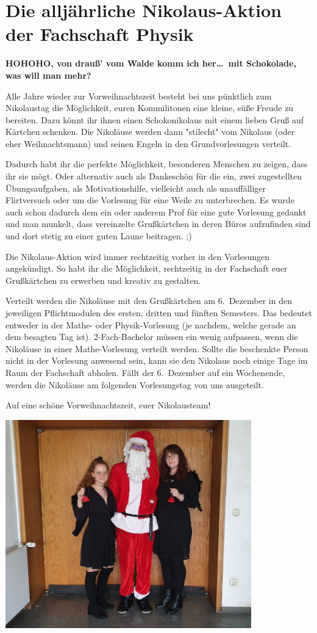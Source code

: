 \section{Die alljährliche Nikolaus-Aktion der Fachschaft Physik}
\begin{multicols}{2}
\textbf{HOHOHO, von drauß' vom Walde komm ich her\dots\
	mit Schokolade, was will man mehr?}

Alle Jahre wieder zur Vorweihnachtszeit besteht bei uns pünktlich zum Nikolaustag die Möglichkeit, euren Kommilitonen eine kleine, süße Freude zu bereiten. Dazu könnt ihr ihnen einen Schokonikolaus mit einem lieben Gruß auf Kärtchen schenken. 
Die Nikoläuse werden dann "stilecht" vom Nikolaus (oder eher Weihnachtsmann) und seinen Engeln in den Grundvorlesungen verteilt.

Dadurch habt ihr die perfekte Möglichkeit, besonderen Menschen zu zeigen, dass ihr sie mögt. Oder alternativ auch als Dankeschön für die ein, zwei zugestellten Übungsaufgaben, als Motivationshilfe, vielleicht auch als unauffälliger Flirtversuch oder um die Vorlesung für eine Weile zu unterbrechen. Es wurde auch schon dadurch dem ein oder anderem Prof für eine gute Vorlesung gedankt und man munkelt, dass vereinzelte Grußkärtchen in deren Büros aufzufinden sind und dort stetig zu einer guten Laune beitragen. ;)

Die Nikolaus-Aktion wird immer rechtzeitig vorher in den Vorlesungen angekündigt. So habt ihr die Möglichkeit, rechtzeitig in der Fachschaft euer Grußkärtchen zu erwerben und kreativ zu gestalten. 

Verteilt werden die Nikoläuse mit den Grußkärtchen am 6.~Dezember in den jeweiligen Pflichtmodulen des ersten, dritten und fünften Semesters. Das bedeutet entweder in der Mathe- oder Physik-Vorlesung (je nachdem, welche gerade an dem besagten Tag ist).
2-Fach-Bachelor müssen ein wenig aufpassen, wenn die Nikoläuse in einer Mathe-Vorlesung verteilt werden.
Sollte die beschenkte Person nicht in der Vorlesung anwesend sein, kann sie den Nikolaus noch einige Tage im Raum der Fachschaft abholen.
Fällt der 6.~Dezember auf ein Wochenende, werden die Nikoläuse am folgenden Vorlesungstag von uns ausgeteilt.

Auf eine schöne Vorweihnachtszeit, euer Nikolausteam!

\end{multicols}

\vspace{\fill}
\begin{center}
	\includegraphics[width=0.8\textwidth]{res/Nikoklaus_cut.jpg}
\end{center}
